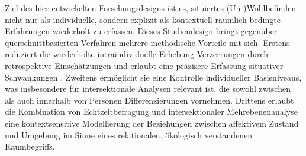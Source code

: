Ziel des hier entwickelten Forschungsdesigns ist es, situiertes (Un\nobreakdash-)Wohl\-be\-find\-en nicht nur als individuelle, sondern explizit als kontextuell-räumlich bedingte Erfahrungen wiederholt zu erfassen. Dieses Studiendesign bringt gegenüber querschnittbasierten Verfahren mehrere methodische Vorteile mit sich. Erstens reduziert die wiederholte intraindividuelle Erhebung Verzerrungen durch retrospektive Einschätzungen und erlaubt eine präzisere Erfassung situativer Schwankungen \parencite{randallDevelopmentTrialMobile2013}. Zweitens ermöglicht sie eine Kontrolle individueller Basisniveaus, was insbesondere für intersektionale Analysen relevant ist, die sowohl zwischen als auch innerhalb von Personen Differenzierungen vornehmen. Drittens erlaubt die Kombination von Echtzeitbefragung und intersektionaler Mehrebenenanalyse eine kontextsensitive Modellierung der Beziehungen zwischen affektivem Zustand und Umgebung im Sinne eines relationalen, ökologisch verstandenen Raumbegriffs.
